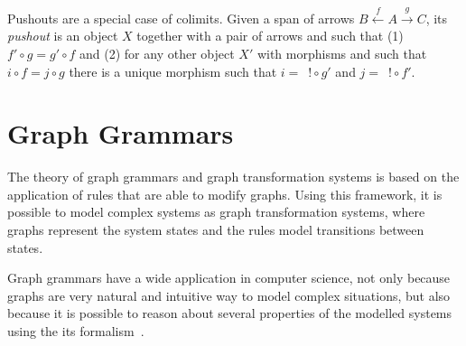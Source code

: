 \begin{definition}[Pushout] Pushouts are a special case of colimits. Given a span of arrows \mbox{$B \xleftarrow{f} A \xrightarrow{g} C$}, its \emph{pushout} is an object $X$ together with a pair of arrows  and  such that (1) \mbox{$f' \circ g = g' \circ f$} and (2) for any other object $X'$ with morphisms  and  such that $i \circ f = j \circ g$ there is a unique morphism  such that \mbox{$i =$ $! \circ g'$} and \mbox{$j =$ $! \circ f'$}.


\end{definition}

\begin{example}
\end{example}

\section{Graph Grammars}

The theory of graph grammars and graph transformation systems is based on the application of rules that are able to modify graphs. Using this framework, it is possible to model complex systems as graph transformation systems, where graphs represent the system states and the rules model transitions between states.

Graph grammars have a wide application in computer science, not only because graphs are very natural and intuitive way to model complex situations, but also because it is possible to reason about several properties of the modelled systems using the its formalism~\cite{Ehrig2006,Rozenberg1997}.

